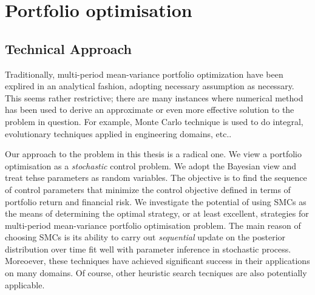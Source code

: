 \chapter{Portfolio optimisation}
\graphicspath{{Chapter4/figures/}}
\label{StaticSecurityPolicyInference}
\label{ch:experiment}

\section{Technical Approach}
Traditionally, multi-period mean-variance portfolio optimization have been explired in an analytical fashion, adopting necessary assumption as necessary. This seems rather restrictive; there are many instances where numerical method has been used to derive an approximate or even more effective solution to the problem in question. For example, Monte Carlo technique is used to do integral, evolutionary techniques applied in engineering domains, etc..

Our approach to the problem in this thesis is a radical one. We view a portfolio optimisation as a \emph{stochastic} control problem. We adopt the Bayesian view and treat tehse parameters as random variables. The objective is to find the sequence of control parameters that minimize the control objective defined in terms of portfolio return and financial risk. We investigate the potential of using SMCs as the means of determining the optimal strategy, or at least excellent, strategies for multi-period mean-variance portfolio optimisation problem. The main reason of choosing SMCs is its ability to carry out \emph{sequential} update on the posterior distribution over time fit well with parameter inference in stochastic process. Moreoever, these techniques have achieved significant success in their applications on many domains. Of course, other heuristic search tecniques are also potentially applicable.


